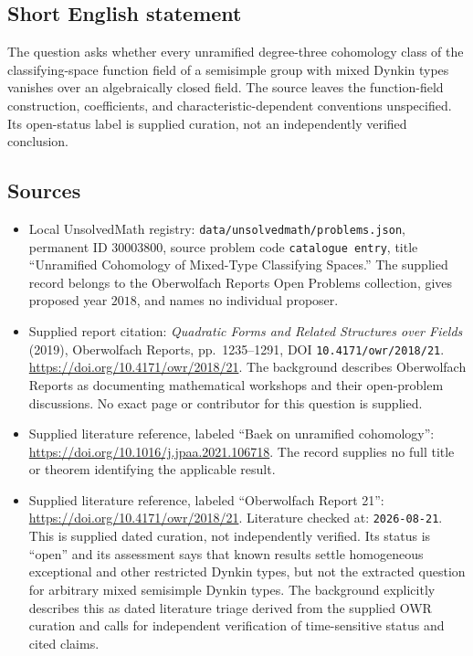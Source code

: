 \documentclass[11pt]{article}
\begin{document}
\subsection{Short English statement}
The question asks whether every unramified degree-three cohomology class of the classifying-space function field of a semisimple group with mixed Dynkin types vanishes over an algebraically closed field. The source leaves the function-field construction, coefficients, and characteristic-dependent conventions unspecified. Its open-status label is supplied curation, not an independently verified conclusion.
\subsection{Sources}
\begin{itemize}
\item Local UnsolvedMath registry: \texttt{data/unsolvedmath/problems.json}, permanent ID \(30003800\), source problem code \texttt{catalogue entry}, title ``Unramified Cohomology of Mixed-Type Classifying Spaces.'' The supplied record belongs to the Oberwolfach Reports Open Problems collection, gives proposed year \(2018\), and names no individual proposer.
\item Supplied report citation: \emph{Quadratic Forms and Related Structures over Fields} (2019), Oberwolfach Reports, pp.~1235--1291, DOI \texttt{10.4171/owr/2018/21}. \url{https://doi.org/10.4171/owr/2018/21}. The background describes Oberwolfach Reports as documenting mathematical workshops and their open-problem discussions. No exact page or contributor for this question is supplied.
\item Supplied literature reference, labeled ``Baek on unramified cohomology'': \url{https://doi.org/10.1016/j.jpaa.2021.106718}. The record supplies no full title or theorem identifying the applicable result.
\item Supplied literature reference, labeled ``Oberwolfach Report 21'': \url{https://doi.org/10.4171/owr/2018/21}. Literature checked at: \texttt{2026-08-21}. This is supplied dated curation, not independently verified. Its status is ``open'' and its assessment says that known results settle homogeneous exceptional and other restricted Dynkin types, but not the extracted question for arbitrary mixed semisimple Dynkin types. The background explicitly describes this as dated literature triage derived from the supplied OWR curation and calls for independent verification of time-sensitive status and cited claims.
\end{itemize}
\end{document}
